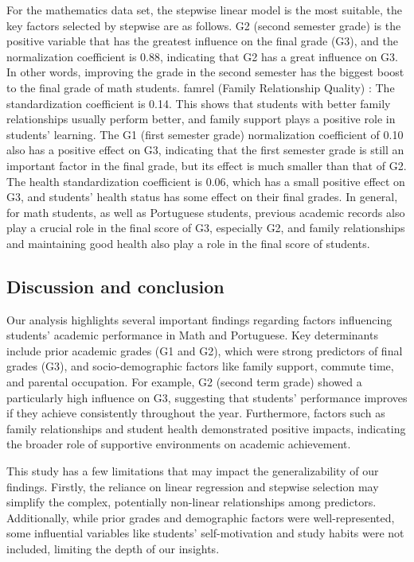 \documentclass[letterpaper,9pt,twocolumn,twoside,]{pinp}
\begin{document}
For the mathematics data set, the stepwise linear model is the most
suitable, the key factors selected by stepwise are as follows. G2
(second semester grade) is the positive variable that has the greatest
influence on the final grade (G3), and the normalization coefficient is
0.88, indicating that G2 has a great influence on G3. In other words,
improving the grade in the second semester has the biggest boost to the
final grade of math students. famrel (Family Relationship Quality) : The
standardization coefficient is 0.14. This shows that students with
better family relationships usually perform better, and family support
plays a positive role in students' learning. The G1 (first semester
grade) normalization coefficient of 0.10 also has a positive effect on
G3, indicating that the first semester grade is still an important
factor in the final grade, but its effect is much smaller than that of
G2. The health standardization coefficient is 0.06, which has a small
positive effect on G3, and students' health status has some effect on
their final grades. In general, for math students, as well as Portuguese
students, previous academic records also play a crucial role in the
final score of G3, especially G2, and family relationships and
maintaining good health also play a role in the final score of students.

\subsection{Discussion and conclusion}\label{discussion-and-conclusion}

Our analysis highlights several important findings regarding factors
influencing students' academic performance in Math and Portuguese. Key
determinants include prior academic grades (G1 and G2), which were
strong predictors of final grades (G3), and socio-demographic factors
like family support, commute time, and parental occupation. For example,
G2 (second term grade) showed a particularly high influence on G3,
suggesting that students' performance improves if they achieve
consistently throughout the year. Furthermore, factors such as family
relationships and student health demonstrated positive impacts,
indicating the broader role of supportive environments on academic
achievement.

This study has a few limitations that may impact the generalizability of
our findings. Firstly, the reliance on linear regression and stepwise
selection may simplify the complex, potentially non-linear relationships
among predictors. Additionally, while prior grades and demographic
factors were well-represented, some influential variables like students'
self-motivation and study habits were not included, limiting the depth
of our insights.
\end{document}
